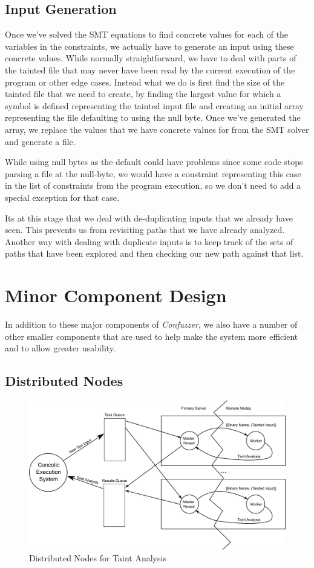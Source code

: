 \subsection{Input Generation}
Once we've solved the SMT equations to find concrete values for each of the
variables in the constraints, we actually have to generate an input using these
concrete values. While normally straightforward, we have to deal with parts of
the tainted file that may never have been read by the current execution of the
program or other edge cases. Instead what we do is first find the size of the
tainted file that we need to create, by finding the largest value for which a
symbol is defined representing the tainted input file and creating an initial
array representing the file defaulting to using the null byte. Once we've
generated the array, we replace the values that we have concrete values for from
the SMT solver and generate a file.

While using null bytes as the default could have problems since some code stops
parsing a file at the null-byte, we would have a constraint representing this
case in the list of constraints from the program execution, so we don't need to
add a special exception for that case.

Its at this stage that we deal with de-duplicating inputs that we already have
seen. This prevents us from revisiting paths that we have already
analyzed. Another way with dealing with duplicate inputs is to keep track of the
sets of paths that have been explored and then checking our new path against
that list.

\section{Minor Component Design}
In addition to these major components of \textit{Confuzzer}, we also have a
number of other smaller components that are used to help make the system more
efficient and to allow greater usability.

\subsection{Distributed Nodes}
\begin{figure}[ht]
 \centering
 \includegraphics{distnodes}
 \caption{Distributed Nodes for Taint Analysis}
 \label{figure:distnodes}
\end{figure}

